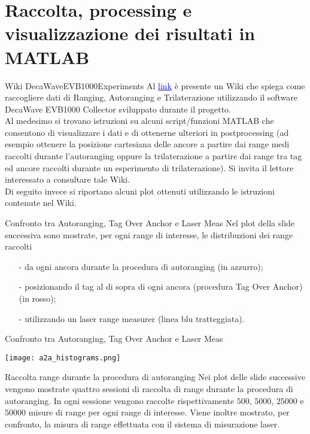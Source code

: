 \section{Raccolta, processing e visualizzazione dei risultati in MATLAB}

\begin{frame}{Wiki DecaWaveEVB1000Experiments}
  Al \href{https://github.com/GiulioRomualdi/DecaWaveEVB1000Experiments/wiki}{\textcolor{blue}{link}} è presente un Wiki che spiega
  come raccogliere dati di Ranging, Autoranging e Trilaterazione utilizzando il software DecaWave EVB1000 Collector sviluppato durante il progetto.\\
  Al medesimo si trovano istruzioni su alcuni script/funzioni MATLAB che consentono di visualizzare i dati e di ottenerne
  ulteriori in postprocessing (ad esempio ottenere la posizione cartesiana delle ancore a partire dai range medi
  raccolti durante l'autoranging oppure la trilaterazione a partire dai range tra tag ed ancore raccolti durante
  un esperimento di trilaterazione).
  Si invita il lettore interessato a consultare tale Wiki.\\
  Di seguito invece si riportano alcuni plot ottenuti utilizzando le istruzioni contenute nel Wiki.
\end{frame}

\begin{frame}{Confronto tra Autoranging, Tag Over Anchor e Laser Meas}
  Nel plot della slide successiva sono mostrate, per ogni range di interesse, le distribuzioni dei range raccolti
  \begin{itemize}
  \item[-] da ogni ancora durante la procedura di autoranging (in azzurro);
  \item[-] posizionando il tag al di sopra di ogni ancora (procedura Tag Over Anchor) (in rosso);
  \item[-] utilizzando un laser range measurer (linea blu tratteggiata).
  \end{itemize}
\end{frame}

\begin{frame}{Confronto tra Autoranging, Tag Over Anchor e Laser Meas}
  \begin{center}
    \texttt{[image: a2a\_histograms.png]}
  \end{center}
\end{frame}

\begin{frame}{Raccolta range durante la procedura di autoranging}
  Nei plot delle slide successive vengono mostrate quattro sessioni di raccolta di range durante la procedura di autoranging.
  In ogni sessione vengono raccolte rispettivamente $500$, $5000$, $25000$ e $50000$ misure di range per ogni range di interesse. Viene inoltre mostrato, per confronto, la misura di range effettuata con il sistema di misurazione laser.
\end{frame}

